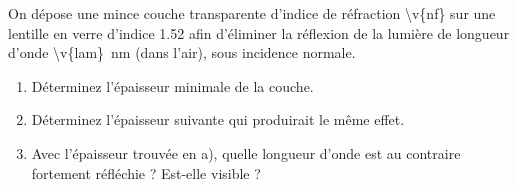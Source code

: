 On dépose une mince couche transparente d'indice de réfraction \num{\v{nf}} sur une lentille en verre d'indice \num{1.52} afin d'éliminer la réflexion de la lumière de longueur d'onde \qty{\v{lam}}{nm} (dans l'air), sous incidence normale.

\begin{enumerate}[label=\alph*)]
    \item Déterminez l'épaisseur minimale de la couche.
    \item Déterminez l'épaisseur suivante qui produirait le même effet.
    \item Avec l'épaisseur trouvée en a), quelle longueur d'onde est au contraire fortement réfléchie ? Est-elle visible ?
\end{enumerate}
